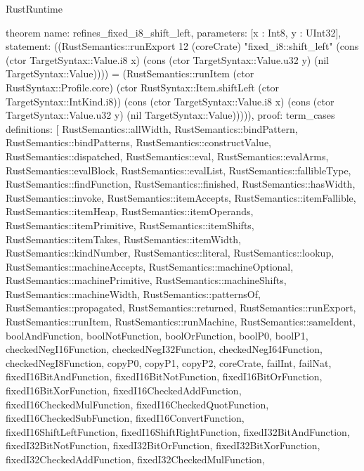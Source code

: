 \begin{lexlean}{RustRuntime}
\begin{semanticmodule}
theorem{
  name: refines_fixed_i8_shift_left,
  parameters: [x : Int8, y : UInt32],
  statement: ((RustSemantics::runExport 12 (coreCrate) "fixed_i8::shift_left" (cons (ctor TargetSyntax::Value.i8 x) (cons (ctor TargetSyntax::Value.u32 y) (nil TargetSyntax::Value)))) = (RustSemantics::runItem (ctor RustSyntax::Profile.core) (ctor RustSyntax::Item.shiftLeft (ctor TargetSyntax::IntKind.i8)) (cons (ctor TargetSyntax::Value.i8 x) (cons (ctor TargetSyntax::Value.u32 y) (nil TargetSyntax::Value))))),
  proof: term_cases{
    definitions: [
      RustSemantics::allWidth,
      RustSemantics::bindPattern,
      RustSemantics::bindPatterns,
      RustSemantics::constructValue,
      RustSemantics::dispatched,
      RustSemantics::eval,
      RustSemantics::evalArms,
      RustSemantics::evalBlock,
      RustSemantics::evalList,
      RustSemantics::fallibleType,
      RustSemantics::findFunction,
      RustSemantics::finished,
      RustSemantics::hasWidth,
      RustSemantics::invoke,
      RustSemantics::itemAccepts,
      RustSemantics::itemFallible,
      RustSemantics::itemHeap,
      RustSemantics::itemOperands,
      RustSemantics::itemPrimitive,
      RustSemantics::itemShifts,
      RustSemantics::itemTakes,
      RustSemantics::itemWidth,
      RustSemantics::kindNumber,
      RustSemantics::literal,
      RustSemantics::lookup,
      RustSemantics::machineAccepts,
      RustSemantics::machineOptional,
      RustSemantics::machinePrimitive,
      RustSemantics::machineShifts,
      RustSemantics::machineWidth,
      RustSemantics::patternsOf,
      RustSemantics::propagated,
      RustSemantics::returned,
      RustSemantics::runExport,
      RustSemantics::runItem,
      RustSemantics::runMachine,
      RustSemantics::sameIdent,
      boolAndFunction,
      boolNotFunction,
      boolOrFunction,
      boolP0,
      boolP1,
      checkedNegI16Function,
      checkedNegI32Function,
      checkedNegI64Function,
      checkedNegI8Function,
      copyP0,
      copyP1,
      copyP2,
      coreCrate,
      failInt,
      failNat,
      fixedI16BitAndFunction,
      fixedI16BitNotFunction,
      fixedI16BitOrFunction,
      fixedI16BitXorFunction,
      fixedI16CheckedAddFunction,
      fixedI16CheckedMulFunction,
      fixedI16CheckedQuotFunction,
      fixedI16CheckedSubFunction,
      fixedI16ConvertFunction,
      fixedI16ShiftLeftFunction,
      fixedI16ShiftRightFunction,
      fixedI32BitAndFunction,
      fixedI32BitNotFunction,
      fixedI32BitOrFunction,
      fixedI32BitXorFunction,
      fixedI32CheckedAddFunction,
      fixedI32CheckedMulFunction,
}}
\end{semanticmodule}
\end{lexlean}
